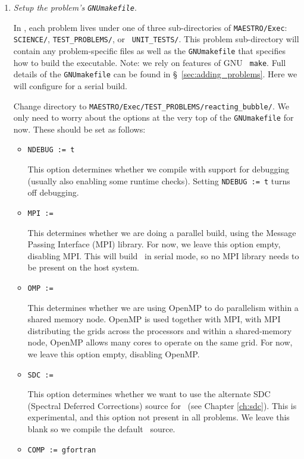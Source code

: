 \begin{enumerate}
\item {\em Setup the problem's {\tt GNUmakefile}}.

In \maestro, each problem lives under one of three sub-directories of
{\tt MAESTRO/Exec}: {\tt SCIENCE/}, {\tt TEST\_PROBLEMS/}, or {\tt
UNIT\_TESTS/}.  This problem sub-directory will contain any
problem-specific files as well as the {\tt GNUmakefile} that specifies
how to build the executable.  Note: we rely on features of GNU {\tt
make}.  Full details of the {\tt GNUmakefile} can be found
in \S~\ref{sec:adding_problems}.  Here we will configure for a serial
build.

Change directory to {\tt MAESTRO/Exec/TEST\_PROBLEMS/reacting\_bubble/}.    
We only need to worry about the options at the very top of the
{\tt GNUmakefile} for now.  These should be set as follows:
\begin{itemize}
\item {\tt NDEBUG := t}

This option determines whether we compile with support for debugging
(usually also enabling some runtime checks).  Setting {\tt NDEBUG := t}
turns off debugging.

\item {\tt MPI := }

This determines whether we are doing a parallel build, using the Message
Passing Interface (MPI) library.  For now, we leave this option empty,
disabling MPI.  This will build \maestro\ in serial mode, so no MPI
library needs to be present on the host system.

\item {\tt OMP := }

This determines whether we are using OpenMP to do parallelism within a
shared memory node.  OpenMP is used together with MPI, with MPI
distributing the grids across the processors and within a
shared-memory node, OpenMP allows many cores to operate on the same
grid.  For now, we leave this option empty, disabling OpenMP.

\item {\tt SDC := }

This option determines whether we want to use the alternate SDC
(Spectral Deferred Corrections) source for \maestro\ (see
Chapter \ref{ch:sdc}).  This is experimental, and this option not present
in all problems.  We leave this blank so we compile the
default \maestro\ source.

\item {\tt COMP := gfortran}


\end{itemize}
\end{enumerate}
